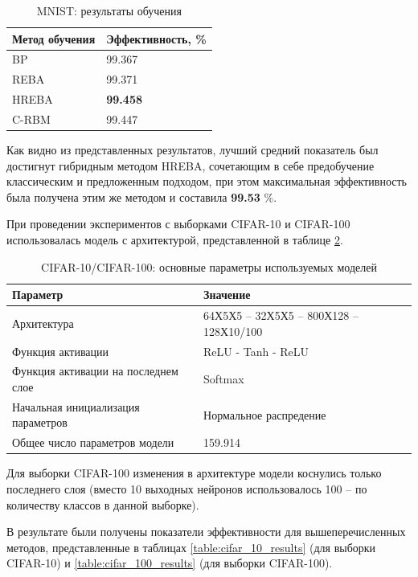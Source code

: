 \begin{table} [!h]
  \caption{MNIST: результаты обучения}\label{table:mnist_results}
\centering
\begin{tabular}{| p{6cm} | p{6cm} |}
  \hline
    \textbf{Метод обучения} & \textbf{Эффективность, \%}\\
    \hline
    BP & 99.367\\
    \hline
    REBA & 99.371\\
    \hline
    HREBA & \textbf{99.458}\\
    \hline
    C-RBM & 99.447\\
    \hline
\end{tabular}
\end{table}

Как видно из представленных результатов, лучший средний показатель был достигнут гибридным методом HREBA, сочетающим в себе предобучение классическим и предложенным подходом, при этом максимальная эффективность была получена этим же методом и составила \textbf{99.53} \%.

При проведении экспериментов с выборками CIFAR-10 и CIFAR-100 использовалась модель с архитектурой, представленной в таблице \ref{table:cifar_comparison_params}.

\begin{table}[!h]
  \caption{CIFAR-10/CIFAR-100: основные параметры используемых моделей}\label{table:cifar_comparison_params}
  \begin{tabular}{|p{7cm}|p{8cm}|}
      \hline
      \textbf{Параметр} & \textbf{Значение}\\
      \hline
      Архитектура & 64Х5Х5 -- 32Х5Х5 -- 800Х128 -- 128Х10/100\\
      \hline
      Функция активации & ReLU - Tanh - ReLU \\
      \hline
      Функция активации на последнем слое & Softmax \\
      \hline
      Начальная инициализация параметров & Нормальное распредение \\
      \hline
      Общее число параметров модели & 159.914
      \\
      \hline
  \end{tabular}
\end{table}

Для выборки CIFAR-100 изменения в архитектуре модели коснулись только последнего слоя (вместо 10 выходных нейронов использовалось 100 -- по количеству классов в данной выборке).

В результате были получены показатели эффективности для вышеперечисленных методов, представленные в таблицах \ref{table:cifar_10_results} (для выборки CIFAR-10) и \ref{table:cifar_100_results} (для выборки CIFAR-100).

